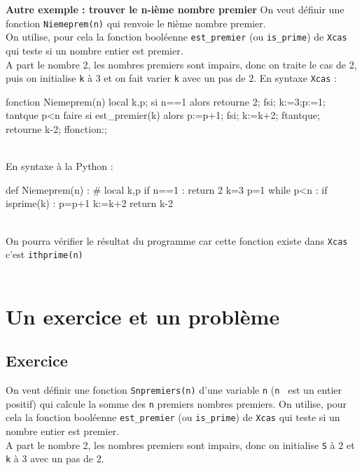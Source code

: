 \documentclass[12pt,a4paper]{book}
\begin{document}
\begin{giacjshere}
{\bf Autre exemple : trouver le n-i\`eme nombre premier}
On veut d\'efinir une fonction {\tt Niemeprem(n)} qui renvoie le 
{\tt n}i\`eme nombre premier.\\
On utilise, pour cela la fonction bool\'eenne {\tt est\_premier} (ou 
{\tt is\_prime}) de {\tt Xcas} qui teste si un nombre entier est premier.\\
A part le nombre 2, les nombres premiers sont impairs, donc on traite le cas de 
2, puis on initialise {\tt k} \`a  3 et on fait varier  {\tt k} avec un pas de 
2.
En syntaxe {\tt Xcas} :
\begin{giaconload}
fonction Niemeprem(n)
  local k,p;
  si n==1 alors retourne 2; fsi;
  k:=3;p:=1;
  tantque p<n faire
    si est_premier(k) alors p:=p+1; fsi;
    k:=k+2;
  ftantque;
  retourne k-2;
ffonction:;  
\end{giaconload}
\\
 En syntaxe \`a la Python :
\begin{giacprog}
def Niemeprem(n) :
    # local k,p
    if n==1 :
        return 2
    k=3
    p=1
    while p<n :
        if isprime(k) : 
            p=p+1
        k:=k+2
    return k-2
\end{giacprog}
\\
On pourra v\'erifier le r\'esultat du programme car cette  fonction  existe 
dans {\tt Xcas} c'est {\tt ithprime(n)}\\
\\

\section{Un exercice et un probl\`eme}
\subsection{Exercice}
On veut d\'efinir une fonction {\tt Snpremiers(n)} d'une variable {\tt n} 
({\tt n } est un  entier positif) qui calcule la somme des {\tt n} premiers 
nombres premiers. On utilise, pour cela la fonction bool\'eenne 
{\tt est\_premier} (ou {\tt is\_prime}) de {\tt Xcas} qui teste si un nombre 
entier est premier.\\
A part le nombre 2, les nombres premiers sont impairs, donc on initialise 
{\tt S} \`a  2 et {\tt k} \`a 3 avec un pas de 2.\\


\end{giacjshere}
\end{document}
